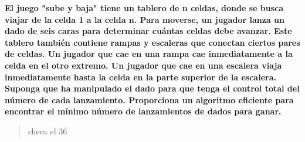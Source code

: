 \textbf{
    El juego "sube y baja" tiene un tablero de n celdas, donde
    se busca viajar de la celda 1 a la celda n. Para moverse, un
    jugador lanza un dado de seis caras para determinar cuántas celdas 
    debe avanzar. Este tablero también contiene rampas y escaleras que
    conectan ciertos pares de celdas. Un jugador que cae en una rampa 
    cae inmediatamente a la celda en el otro extremo. Un jugador que 
    cae en una escalera viaja inmediatamente hasta la celda en la parte 
    superior de la escalera. Suponga que ha manipulado el dado para que 
    tenga el control total del número de cada lanzamiento. Proporciona un
    algoritmo eficiente para encontrar el mínimo número de lanzamientos de
    dados para ganar.
}\vspace{.2cm}
\textcolor{bibi}{}
\begin{quote}
    checa el 36
\end{quote}
